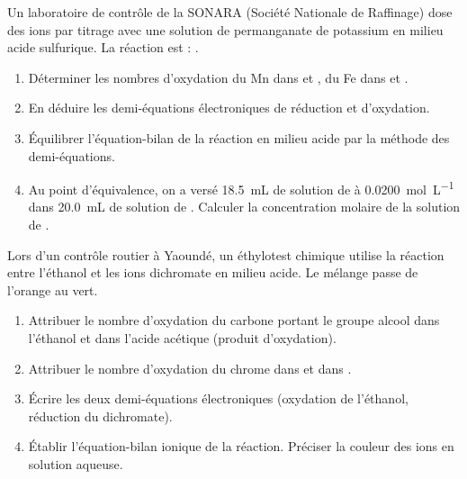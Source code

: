 \documentclass[11pt]{article}
\begin{document}
\begin{exercice}
Un laboratoire de contrôle de la SONARA (Société Nationale de Raffinage) dose des ions  par titrage avec une solution de permanganate de potassium  en milieu acide sulfurique. La réaction est : .
\begin{enumerate}
    \item Déterminer les nombres d'oxydation du Mn dans  et , du Fe dans  et .
    \item En déduire les demi-équations électroniques de réduction et d'oxydation.
    \item Équilibrer l'équation-bilan de la réaction en milieu acide par la méthode des demi-équations.
    \item Au point d'équivalence, on a versé \SI{18.5}{mL} de solution de  à \SI{0.0200}{mol.L^{-1}} dans \SI{20.0}{mL} de solution de . Calculer la concentration molaire de la solution de .
\end{enumerate}
\end{exercice}

\begin{exercice}
Lors d'un contrôle routier à Yaoundé, un éthylotest chimique utilise la réaction entre l'éthanol  et les ions dichromate  en milieu acide. Le mélange passe de l'orange au vert.
\begin{enumerate}
    \item Attribuer le nombre d'oxydation du carbone portant le groupe alcool dans l'éthanol et dans l'acide acétique  (produit d'oxydation).
    \item Attribuer le nombre d'oxydation du chrome dans  et dans .
    \item Écrire les deux demi-équations électroniques (oxydation de l'éthanol, réduction du dichromate).
    \item Établir l'équation-bilan ionique de la réaction. Préciser la couleur des ions  en solution aqueuse.
\end{enumerate}
\end{exercice}
\end{document}
